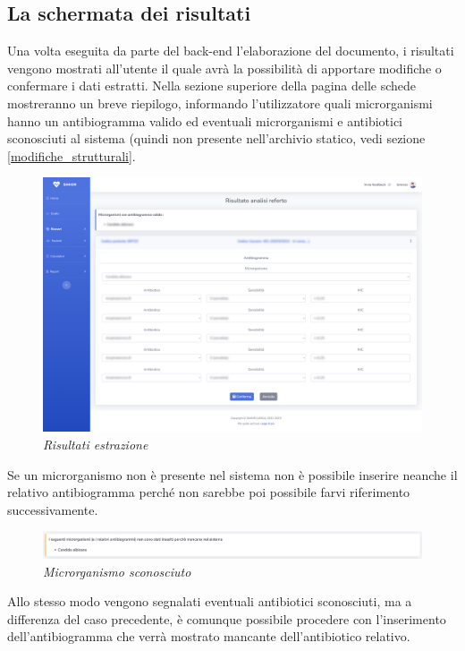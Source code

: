 \subsection{La schermata dei risultati}
Una volta eseguita da parte del back-end l'elaborazione del documento, i risultati vengono mostrati all'utente il quale avrà la possibilità di apportare modifiche o confermare i dati estratti.
Nella sezione superiore della pagina delle schede mostreranno un breve riepilogo, informando l'utilizzatore quali microrganismi hanno un antibiogramma valido ed eventuali microrganismi e antibiotici sconosciuti al sistema (quindi non presente nell'archivio statico, vedi sezione \ref{modifiche_strutturali}.
\begin{figure}[h!]
	\centering
	\includegraphics[width=.99\columnwidth]{images/extraction_result.png}
	\caption{\textit{Risultati estrazione}}
	\label{fig:extraction_result}
\end{figure}
\newline
Se un microrganismo non è presente nel sistema non è possibile inserire neanche il relativo antibiogramma perché non sarebbe poi possibile farvi riferimento successivamente.
\begin{figure}[h!]
	\centering
	\includegraphics[width=.99\columnwidth]{images/static_missing.png}
	\caption{\textit{Microrganismo sconosciuto}}
	\label{fig:missing_micro}
\end{figure}
\newline
Allo stesso modo vengono segnalati eventuali antibiotici sconosciuti, ma a differenza del caso precedente, è comunque possibile procedere con l'inserimento dell'antibiogramma che verrà mostrato mancante dell'antibiotico relativo.
